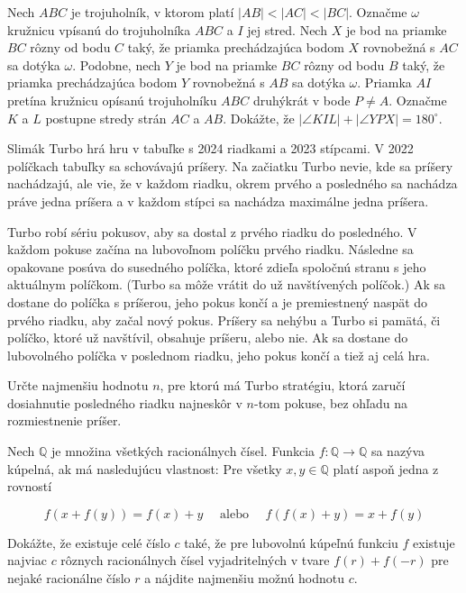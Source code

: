 {%
Nech $A B C$ je trojuholník, v ktorom platí $|A B|<|A C|<|B C|$. Označme $\omega$ kružnicu vpísanú do trojuholníka $A B C$ a $I$ jej stred. Nech $X$ je bod na priamke $B C$ rôzny od bodu $C$ taký, že priamka prechádzajúca bodom $X$ rovnobežná s $A C$ sa dotýka $\omega$. Podobne, nech $Y$ je bod na priamke $B C$ rôzny od bodu $B$ taký, že priamka prechádzajúca bodom $Y$ rovnobežná s $A B$ sa dotýka $\omega$. Priamka $A I$ pretína kružnicu opísanú trojuholníku $A B C$ druhýkrát v bode $P \neq A$. Označme $K$ a $L$ postupne stredy strán $A C$ a $A B$.
Dokážte, že $|\angle K I L|+|\angle Y P X|=180^{\circ}$.}

{%
Slimák Turbo hrá hru v tabuľke s 2024 riadkami a 2023 stípcami. V 2022 políčkach tabuľky sa schovávajú príšery. Na začiatku Turbo nevie, kde sa príšery nachádzajú, ale vie, že v každom riadku, okrem prvého a posledného sa nachádza práve jedna príšera a v každom stípci sa nachádza maximálne jedna príšera.

Turbo robí sériu pokusov, aby sa dostal z prvého riadku do posledného. V každom pokuse začína na lubovoľnom políčku prvého riadku. Následne sa opakovane posúva do susedného políčka, ktoré zdieľa spoločnú stranu s jeho aktuálnym políčkom. (Turbo sa môže vrátit do už navštívených políčok.) Ak sa dostane do políčka s príšerou, jeho pokus končí a je premiestnený naspät do prvého riadku, aby začal nový pokus. Príšery sa nehýbu a Turbo si pamätá, či políčko, ktoré už navštívil, obsahuje príšeru, alebo nie. Ak sa dostane do lubovolného políčka v poslednom riadku, jeho pokus končí a tiež aj celá hra.

Určte najmenšiu hodnotu $n$, pre ktorú má Turbo stratégiu, ktorá zaručí dosiahnutie posledného riadku najneskôr v $n$-tom pokuse, bez ohľadu na rozmiestnenie príšer.}

{%
Nech $\mathbb{Q}$ je množina všetkých racionálnych čísel. Funkcia $f: \mathbb{Q} \rightarrow \mathbb{Q}$ sa nazýva kúpelná, ak má nasledujúcu vlastnost: Pre všetky $x, y \in \mathbb{Q}$ platí aspoň jedna z rovností

$$
f(x+f(y))=f(x)+y \quad \text { alebo } \quad f(f(x)+y)=x+f(y)
$$

Dokážte, že existuje celé číslo $c$ také, že pre lubovolnú kúpeľnú funkciu $f$ existuje najviac $c$ rôznych racionálnych čísel vyjadritelných v tvare $f(r)+f(-r)$ pre nejaké racionálne číslo $r$ a nájdite najmenšiu možnú hodnotu $c$.}

